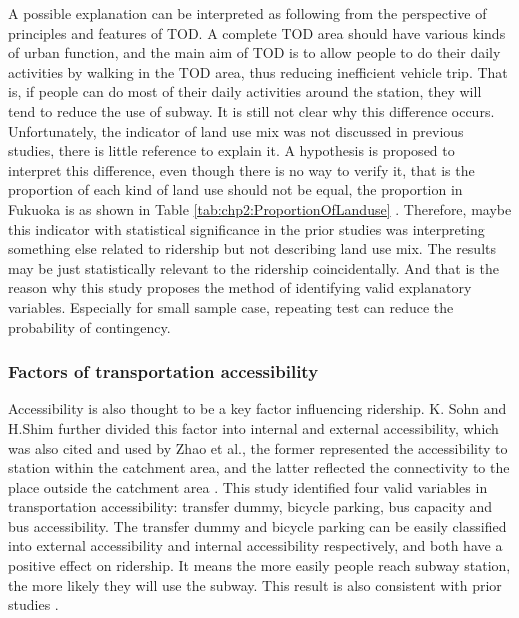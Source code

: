 %
A possible explanation can be interpreted as following from the perspective of principles and features of TOD. A complete TOD area should have various kinds of urban function, and the main aim of TOD is to allow people to do their daily activities by walking in the TOD area, thus reducing inefficient vehicle trip. That is, if people can do most of their daily activities around the station, they will tend to reduce the use of subway. It is still not clear why this difference occurs. Unfortunately, the indicator of land use mix was not discussed in previous studies, there is little reference to explain it. A hypothesis is proposed to interpret this difference, even though there is no way to verify it, that is the proportion of each kind of land use should not be equal, the proportion in Fukuoka is as shown in Table \ref{tab:chp2:ProportionOfLanduse} \cite{bhat2007comprehensive}. Therefore, maybe this indicator with statistical significance in the prior studies was interpreting something else related to ridership but not describing land use mix. The results may be just statistically relevant to the ridership coincidentally. And that is the reason why this study proposes the method of identifying valid explanatory variables. Especially for small sample case, repeating test can reduce the probability of contingency.

%
\subsubsection{Factors of transportation accessibility}
%
Accessibility is also thought to be a key factor influencing ridership. K. Sohn and H.Shim further divided this factor into internal and external accessibility, which was also cited and used by Zhao et al., the former represented the accessibility to station within the catchment area, and the latter reflected the connectivity to the place outside the catchment area \cite{sohn2010factors,zhao2013influences}. This study identified four valid variables in transportation accessibility: transfer dummy, bicycle parking, bus capacity and bus accessibility. The transfer dummy and bicycle parking can be easily classified into external accessibility and internal accessibility respectively, and both have a positive effect on ridership. It means the more easily people reach subway station, the more likely they will use the subway. This result is also consistent with prior studies \cite{gutierrez2011transit,cardozo2012application,kuby2004factors}.

